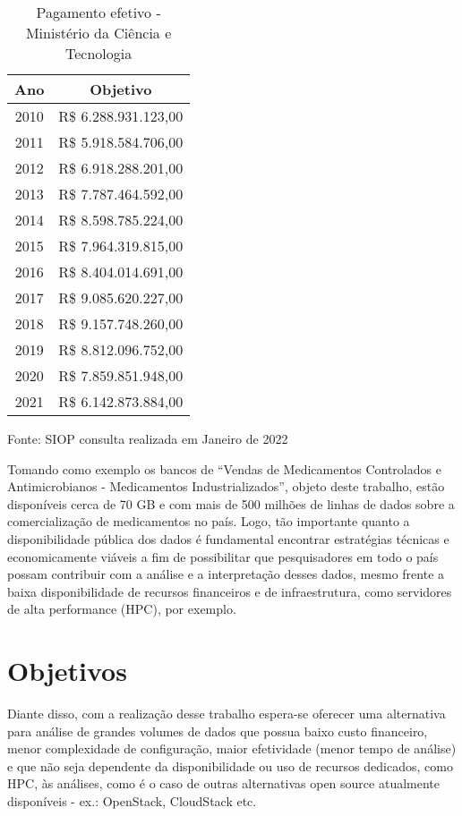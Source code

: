 \begin{table}[htpb]
  \caption{Pagamento efetivo - Ministério da Ciência e Tecnologia}
  \label{tab:orcamento}
  \begin{tabular}{cc}
    \hline
    \textbf{Ano} & \textbf{Objetivo}    \\
    \hline
    2010         & R\$ 6.288.931.123,00 \\
    2011         & R\$ 5.918.584.706,00 \\
    2012         & R\$ 6.918.288.201,00 \\
    2013         & R\$ 7.787.464.592,00 \\
    2014         & R\$ 8.598.785.224,00 \\
    2015         & R\$ 7.964.319.815,00 \\
    2016         & R\$ 8.404.014.691,00 \\
    2017         & R\$ 9.085.620.227,00 \\
    2018         & R\$ 9.157.748.260,00 \\
    2019         & R\$ 8.812.096.752,00 \\
    2020         & R\$ 7.859.851.948,00 \\
    2021         & R\$ 6.142.873.884,00
  \end{tabular}
  \centering
  \begin{tablenotes}
    \small
    \item{Fonte: SIOP consulta realizada em Janeiro de 2022}
  \end{tablenotes}
\end{table}

Tomando como exemplo os bancos de “Vendas de Medicamentos Controlados e Antimicrobianos - Medicamentos Industrializados”, objeto deste trabalho, estão disponíveis cerca de 70 GB e com mais de 500 milhões de linhas de dados sobre a comercialização de medicamentos no país. Logo, tão importante quanto a disponibilidade pública dos dados é fundamental encontrar estratégias técnicas e economicamente viáveis a fim de possibilitar que pesquisadores em todo o país possam contribuir com a análise e a interpretação desses dados, mesmo frente a baixa disponibilidade de recursos financeiros e de infraestrutura, como servidores de alta performance (HPC), por exemplo.

\section{Objetivos}
\label{sec:objetivos}
Diante disso, com a realização desse trabalho espera-se oferecer uma alternativa para análise de grandes volumes de dados que possua baixo custo financeiro, menor complexidade de configuração, maior efetividade (menor tempo de análise) e que não seja dependente da disponibilidade ou uso de recursos dedicados, como HPC, às análises, como é o caso de outras alternativas open source atualmente disponíveis - ex.: OpenStack, CloudStack etc.

